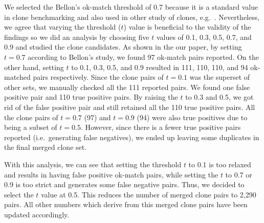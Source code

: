 \documentclass[a4paper,twoside,10pt]{reviewresponse}
\begin{document}
We selected the Bellon's ok-match threshold of 0.7 because it is a standard value in clone benchmarking \citep{Bellon2007} and also used in other study of clones, e.g.~\cite{Sajnani2016}. Nevertheless, we agree that varying the threshold ($t$) value is beneficial to the validity of the findings so we did an analysis by choosing five $t$ values of 0.1, 0.3, 0.5, 0.7, and 0.9 and studied the clone candidates. As shown in the our paper, by setting $t=0.7$ according to Bellon's study, we found 97 ok-match pairs reported. On the other hand, setting $t$ to 0.1, 0.3, 0.5, and 0.9 resulted in 111, 110, 110, and 94 ok-matched pairs respectively.
Since the clone pairs of $t=0.1$ was the superset of other sets,  we manually checked all the 111 reported pairs.
We found one false positive pair and 110 true positive pairs. By raising the $t$ to 0.3 and 0.5, we got rid of the false positive pair and still retained all the 110 true positive pairs. All the clone pairs of $t=0.7$ (97) and $t=0.9$ (94) were also true positives due to being a subset of $t=0.5$. However, since there is a fewer true positive pairs reported (i.e.~generating false negatives), we ended up leaving some duplicates in the final merged clone set.

With this analysis, we can see that setting the threshold $t$ to 0.1 is too relaxed and results in having false positive ok-match pairs, while setting the $t$ to 0.7 or 0.9 is too strict and generates some false negative pairs. Thus, we decided to select the $t$ value at 0.5. This reduces the number of merged clone pairs to 2,290 pairs. All other numbers which derive from this merged clone pairs have been updated accordingly.

\end{document}
